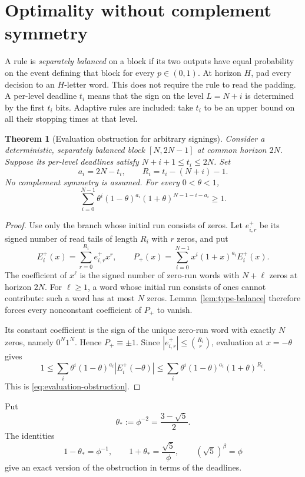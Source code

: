 \documentclass[11pt]{article}
\newtheorem{theorem}{Theorem}[section]
\theoremstyle{definition}
\theoremstyle{remark}
\begin{document}
\section{Optimality without complement symmetry}\label{sec:optimality}

A rule is \emph{separately balanced} on a block if its two outputs have
equal probability on the event defining that block for every $p\in(0,1)$.
At horizon $H$, pad every decision to an $H$-letter word. This does not
require the rule to read the padding. A per-level deadline $t_i$ means
that the sign on the level $L=N+i$ is determined by the first $t_i$ bits.
Adaptive rules are included: take $t_i$ to be an upper bound on all their
stopping times at that level.

\begin{theorem}[Evaluation obstruction for arbitrary signings]\label{thm:obstruction}
Consider a deterministic, separately balanced block $[N,2N-1]$ at common
horizon $2N$. Suppose its per-level deadlines satisfy
$N+i+1\le t_i\le2N$. Set
\[
 a_i=2N-t_i,\qquad R_i=t_i-(N+i)-1.
\]
No complement symmetry is assumed. For every $0<\theta<1$,
\begin{equation}\label{eq:evaluation-obstruction}
 \sum_{i=0}^{N-1}\theta^i(1-\theta)^{a_i}
                  (1+\theta)^{N-1-i-a_i}\ge1.
\end{equation}
\end{theorem}
\begin{proof}
Use only the branch whose initial run consists of zeros. Let $e^+_{i,r}$
be its signed number of read tails of length $R_i$ with $r$ zeros, and put
\[
 E_i^+(x)=\sum_{r=0}^{R_i}e^+_{i,r}x^r,\qquad
 P_+(x)=\sum_{i=0}^{N-1}x^i(1+x)^{a_i}E_i^+(x).
\]
The coefficient of $x^\ell$ is the signed number of zero-run words with
$N+\ell$ zeros at horizon $2N$. For $\ell\ge1$, a word whose initial
run consists of ones cannot contribute: such a word has at most $N$
zeros. Lemma~\ref{lem:type-balance} therefore forces every nonconstant
coefficient of $P_+$ to vanish.

Its constant coefficient is the sign of the unique zero-run word with
exactly $N$ zeros, namely $0^N1^N$. Hence $P_+\equiv\pm1$.
Since $|e^+_{i,r}|\le\binom{R_i}{r}$, evaluation at $x=-\theta$ gives
\[
 1\le\sum_i\theta^i(1-\theta)^{a_i}|E_i^+(-\theta)|
 \le\sum_i\theta^i(1-\theta)^{a_i}(1+\theta)^{R_i}.
\]
This is \eqref{eq:evaluation-obstruction}.
\end{proof}

Put
\begin{equation}\label{eq:theta-star}
 \theta_*:=\phi^{-2}=\frac{3-\sqrt5}{2}.
\end{equation}
The identities
\[
 1-\theta_*=\phi^{-1},\qquad
 1+\theta_*=\frac{\sqrt5}{\phi},\qquad
 (\sqrt5)^\beta=\phi
\]
give an exact version of the obstruction in terms of the deadlines.
\end{document}
